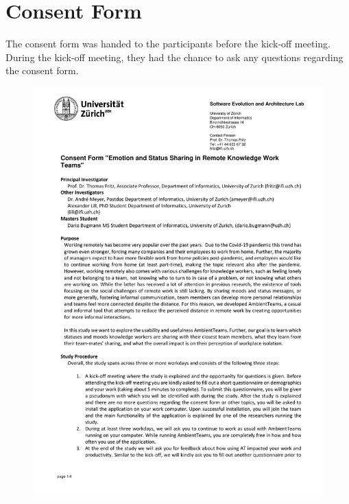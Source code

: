 \chapter{Consent Form}
\label{chapter:consent_form}
The consent form was handed to the participants before the kick-off meeting. During the kick-off meeting, they had the chance to ask any questions regarding the consent form.

\begin{figure}[h]
    \centering
    \includegraphics[width=\linewidth, page=1]{./documents/consent_form.pdf}
\end{figure}

